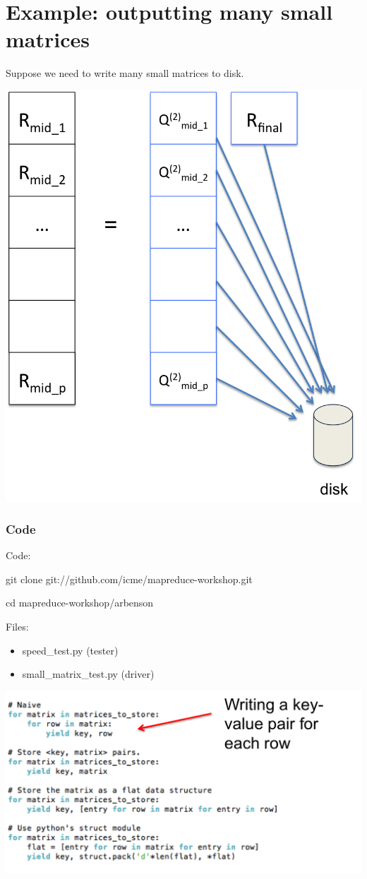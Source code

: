 \documentclass{beamer}
\begin{document}
\section{Example: outputting many small matrices}

\begin{frame}

Suppose we need to write many small matrices to disk.

\begin{center}
\includegraphics[height=2.in]{./images/full_2.png}
\end{center}

\end{frame}


\begin{frame}
\frametitle{Code}

Code: 

\vspace{0.2in}

git clone git://github.com/icme/mapreduce-workshop.git

cd mapreduce-workshop/arbenson

\vspace{0.2in}

Files:

\begin{itemize}
\item{speed\_test.py (tester)}
\item{small\_matrix\_test.py (driver)}
\end{itemize}


\end{frame}



\begin{frame}

\begin{center}
\includegraphics[height=2.in]{./images/small1.png}
\end{center}

\end{frame}
\end{document}
